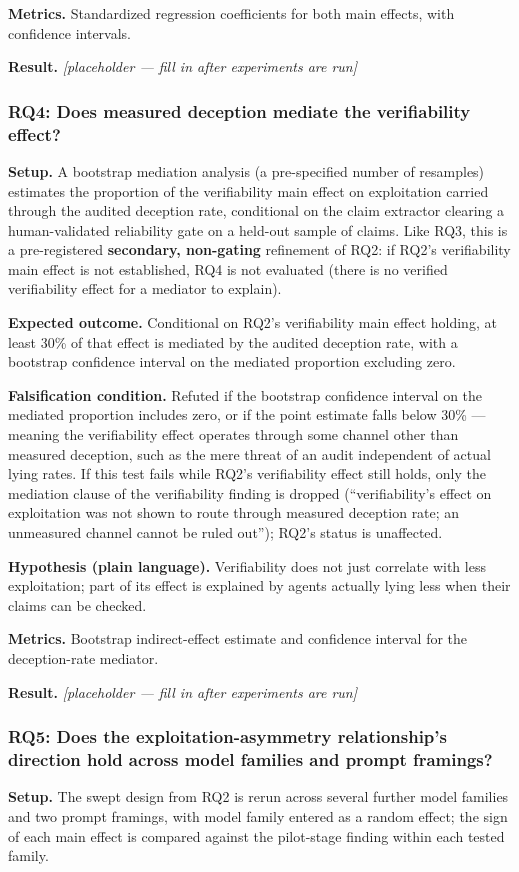 \documentclass[11pt]{article}
\newcommand{\ph}{\textit{[placeholder --- fill in after experiments are run]}}
\begin{document}
\textbf{Metrics.} Standardized regression coefficients for both main effects, with confidence intervals.

\textbf{Result.} \ph

\subsubsection{RQ4: Does measured deception mediate the verifiability effect?}
\textbf{Setup.} A bootstrap mediation analysis (a pre-specified number of resamples) estimates the proportion of the verifiability main effect on exploitation carried through the audited deception rate, conditional on the claim extractor clearing a human-validated reliability gate on a held-out sample of claims. Like RQ3, this is a pre-registered \textbf{secondary, non-gating} refinement of RQ2: if RQ2's verifiability main effect is not established, RQ4 is not evaluated (there is no verified verifiability effect for a mediator to explain).

\textbf{Expected outcome.} Conditional on RQ2's verifiability main effect holding, at least 30\% of that effect is mediated by the audited deception rate, with a bootstrap confidence interval on the mediated proportion excluding zero.

\textbf{Falsification condition.} Refuted if the bootstrap confidence interval on the mediated proportion includes zero, or if the point estimate falls below 30\% --- meaning the verifiability effect operates through some channel other than measured deception, such as the mere threat of an audit independent of actual lying rates. If this test fails while RQ2's verifiability effect still holds, only the mediation clause of the verifiability finding is dropped (``verifiability's effect on exploitation was not shown to route through measured deception rate; an unmeasured channel cannot be ruled out''); RQ2's status is unaffected.

\textbf{Hypothesis (plain language).} Verifiability does not just correlate with less exploitation; part of its effect is explained by agents actually lying less when their claims can be checked.

\textbf{Metrics.} Bootstrap indirect-effect estimate and confidence interval for the deception-rate mediator.

\textbf{Result.} \ph

\subsubsection{RQ5: Does the exploitation-asymmetry relationship's direction hold across model families and prompt framings?}
\textbf{Setup.} The swept design from RQ2 is rerun across several further model families and two prompt framings, with model family entered as a random effect; the sign of each main effect is compared against the pilot-stage finding within each tested family.
\end{document}
